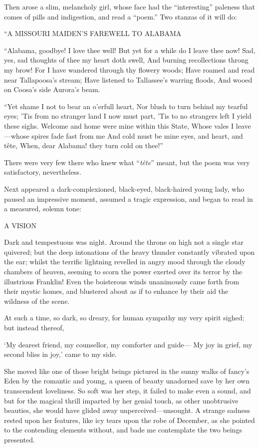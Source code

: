 \documentclass{book}
\begin{document}
Then arose a slim, melancholy girl, whose face had the “interesting” paleness that comes of pills and indigestion, and read a “poem.” Two stanzas of it will do:

“A MISSOURI MAIDEN’S FAREWELL TO ALABAMA

“Alabama, goodbye! I love thee well! But yet for a while do I leave thee now! Sad, yes, sad thoughts of thee my heart doth swell, And burning recollections throng my brow! For I have wandered through thy flowery woods; Have roamed and read near Tallapoosa’s stream; Have listened to Tallassee’s warring floods, And wooed on Coosa’s side Aurora’s beam.

“Yet shame I not to bear an o’erfull heart, Nor blush to turn behind my tearful eyes; ’Tis from no stranger land I now must part, ’Tis to no strangers left I yield these sighs. Welcome and home were mine within this State, Whose vales I leave—whose spires fade fast from me And cold must be mine eyes, and heart, and tête, When, dear Alabama! they turn cold on thee!”

There were very few there who knew what “\emph{tête}” meant, but the poem was very satisfactory, nevertheless.

Next appeared a dark-complexioned, black-eyed, black-haired young lady, who paused an impressive moment, assumed a tragic expression, and began to read in a measured, solemn tone:

A VISION

Dark and tempestuous was night. Around the throne on high not a single star quivered; but the deep intonations of the heavy thunder constantly vibrated upon the ear; whilst the terrific lightning revelled in angry mood through the cloudy chambers of heaven, seeming to scorn the power exerted over its terror by the illustrious Franklin! Even the boisterous winds unanimously came forth from their mystic homes, and blustered about as if to enhance by their aid the wildness of the scene.

At such a time, so dark, so dreary, for human sympathy my very spirit sighed; but instead thereof,

‘My dearest friend, my counsellor, my comforter and guide— My joy in grief, my second bliss in joy,’ came to my side.

She moved like one of those bright beings pictured in the sunny walks of fancy’s Eden by the romantic and young, a queen of beauty unadorned save by her own transcendent loveliness. So soft was her step, it failed to make even a sound, and but for the magical thrill imparted by her genial touch, as other unobtrusive beauties, she would have glided away unperceived—unsought. A strange sadness rested upon her features, like icy tears upon the robe of December, as she pointed to the contending elements without, and bade me contemplate the two beings presented.
\end{document}
